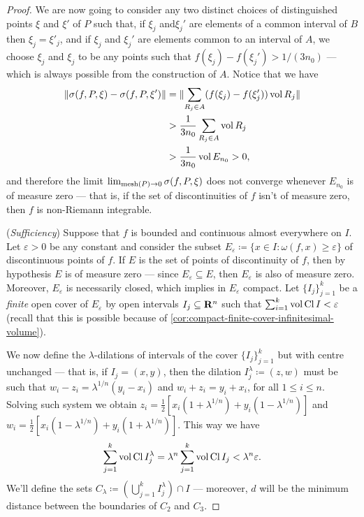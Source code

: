 \begin{proof}
We are now going to consider any two distinct choices of distinguished points
\(\xi\) and \(\xi'\) of \(P\) such that, if \(\xi_j\) and\(\xi_j'\) are elements
of a common interval of \(B\) then \(\xi_j = \xi'_j\), and if \(\xi_j\) and
\(\xi_j'\) are elements common to an interval of \(A\), we choose \(\xi_j\) and
\(\xi_j\) to be any points such that \(f(\xi_j) - f(\xi_j') > 1/(3n_0)\) ---
which is always possible from the construction of \(A\). Notice that we have
\begin{align*}
  \lVert\sigma(f, P, \xi) - \sigma(f, P, \xi')\rVert
  &= \lVert\sum_{R_{j} \in A} (f(\xi_j) - f(\xi_j')) \operatorname{vol} R_j\rVert \\
  &> \frac 1 {3 n_0} \sum_{R_j \in A} \operatorname{vol} R_j \\
  &> \frac 1 {3 n_0} \operatorname{vol} E_{n_0} > 0,
\end{align*}
and therefore the limit \(\lim_{\operatorname{mesh}(P) \to 0} \sigma(f, P, \xi)\) does not
converge whenever \(E_{n_0}\) is of measure zero --- that is, if the set of
discontinuities of \(f\) isn't of measure zero, then \(f\) is non-Riemann
integrable.

(\emph{Sufficiency}) Suppose that \(f\) is bounded and continuous almost
everywhere on \(I\). Let \(\varepsilon > 0\) be any constant and consider the
subset \(E_{\varepsilon} \coloneq \{x \in I \colon \omega(f, x) \geq \varepsilon\}\)
of discontinuous points of \(f\). If \(E\) is the set of points of discontinuity
of \(f\), then by hypothesis \(E\) is of measure zero --- since
\(E_{\varepsilon} \subseteq E\), then \(E_{\varepsilon}\) is also of measure
zero. Moreover, \(E_{\varepsilon}\) is necessarily closed, which implies in
\(E_{\varepsilon}\) compact. Let \(\{I_{j}\}_{j=1}^k\) be a \emph{finite} open
cover of \(E_{\varepsilon}\) by open intervals \(I_j \subseteq \mathbf{R}^n\) such that
\(\sum_{i=1}^k \operatorname{vol} \operatorname{Cl} I < \varepsilon\) (recall that this is possible
because of \cref{cor:compact-finite-cover-infinitesimal-volume}).

We now define the \(\lambda\)-dilations of intervals of the cover
\(\{I_{j}\}_{j=1}^k\) but with centre unchanged --- that is, if \(I_j = (x,
y)\), then the dilation \(I_{j}^{\lambda} \coloneq (z, w)\) must be such that
\(w_i - z_i = \lambda^{1/n} (y_i - x_i)\) and \(w_i + z_i = y_i + x_i\), for all
\(1 \leq i \leq n\). Solving such system we obtain \(z_i = \frac 1 2 [x_i(1 +
\lambda^{1/n}) + y_i(1 - \lambda^{1/n})]\) and \(w_i = \frac 1 2 [x_i(1 -
\lambda^{1/n}) + y_i(1 + \lambda^{1/n})]\). This way we have
\[
  \sum_{j=1}^k \operatorname{vol} \operatorname{Cl} I_j^{\lambda}
  = \lambda^n \sum_{j=1}^k \operatorname{vol} \operatorname{Cl} I_j
  < \lambda^n \varepsilon.
\]
We'll define the sets \(C_{\lambda} \coloneq (\bigcup_{j=1}^k I_j^{\lambda})
\cap I\) --- moreover, \(d\) will be the minimum distance between the boundaries
of \(C_2\) and \(C_3\).


\end{proof}
